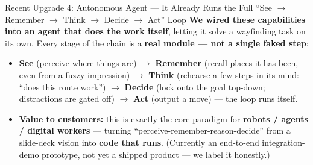 ﻿\documentclass[aspectratio=169, 10pt]{beamer}
\begin{document}
\begin{frame}{Recent Upgrade 4: Autonomous Agent --- It Already Runs the Full ``See $\rightarrow$ Remember $\rightarrow$ Think $\rightarrow$ Decide $\rightarrow$ Act'' Loop}
\small
\textbf{We wired these capabilities into an agent that does the work itself}, letting it solve a wayfinding task on its own. Every stage of the chain is a \textbf{real module --- not a single faked step}:
\begin{itemize}\itemsep=0.4em
    \item \textbf{See} (perceive where things are) $\rightarrow$ \textbf{Remember} (recall places it has been, even from a fuzzy impression) $\rightarrow$ \textbf{Think} (rehearse a few steps in its mind: ``does this route work'') $\rightarrow$ \textbf{Decide} (lock onto the goal top-down; distractions are gated off) $\rightarrow$ \textbf{Act} (output a move) --- the loop runs itself.
    \item \textbf{Value to customers:} this is exactly the core paradigm for \textbf{robots / agents / digital workers} --- turning ``perceive-remember-reason-decide'' from a slide-deck vision into \textbf{code that runs}. (Currently an end-to-end integration-demo prototype, not yet a shipped product --- we label it honestly.)
\end{itemize}
\end{frame}
\end{document}
